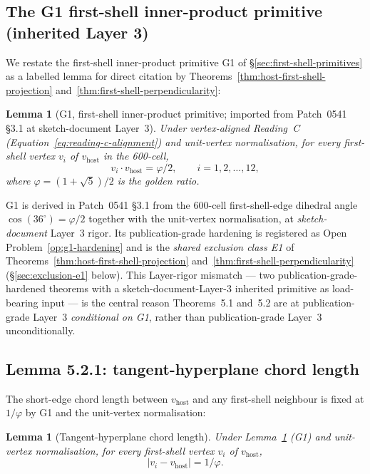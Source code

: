 \documentclass[11pt,letterpaper]{article}
\newtheorem{lemma}[theorem]{Lemma}
\newcommand{\phig}{\varphi}
\newcommand{\vhost}{v_{\text{host}}}
\begin{document}
\subsection{The G1 first-shell inner-product primitive (inherited Layer 3)}
\label{sec:g1-primitive-recap}

We restate the first-shell inner-product primitive G1 of \S\ref{sec:first-shell-primitives} as a labelled lemma for direct citation by Theorems~\ref{thm:host-first-shell-projection} and~\ref{thm:first-shell-perpendicularity}:

\begin{lemma}[G1, first-shell inner-product primitive; imported from Patch~0541 \S3.1 at sketch-document Layer~3]
\label{lem:g1-imported}
Under vertex-aligned Reading~C (Equation~\eqref{eq:reading-c-alignment}) and unit-vertex normalisation, for every first-shell vertex $v_i$ of $\vhost$ in the 600-cell,
\begin{equation}
v_i \cdot \vhost = \phig / 2, \qquad i = 1, 2, \ldots, 12,
\end{equation}
where $\phig = (1 + \sqrt{5})/2$ is the golden ratio.
\end{lemma}

G1 is derived in Patch~0541 \S3.1 from the 600-cell first-shell-edge dihedral angle $\cos(36^{\circ}) = \phig/2$ together with the unit-vertex normalisation, at \emph{sketch-document} Layer~3 rigor. Its publication-grade hardening is registered as Open Problem~\ref{op:g1-hardening} and is the \emph{shared exclusion class E1} of Theorems~\ref{thm:host-first-shell-projection} and~\ref{thm:first-shell-perpendicularity} (\S\ref{sec:exclusion-e1} below). This Layer-rigor mismatch --- two publication-grade-hardened theorems with a sketch-document-Layer-3 inherited primitive as load-bearing input --- is the central reason Theorems~5.1 and~5.2 are at publication-grade Layer~3 \emph{conditional on G1}, rather than publication-grade Layer~3 unconditionally.

\subsection{Lemma 5.2.1: tangent-hyperplane chord length}
\label{sec:tangent-hyperplane-chord-length}

The short-edge chord length between $\vhost$ and any first-shell neighbour is fixed at $1/\phig$ by G1 and the unit-vertex normalisation:

\begin{lemma}[Tangent-hyperplane chord length]
\label{lem:chord-length}
Under Lemma~\ref{lem:g1-imported} (G1) and unit-vertex normalisation, for every first-shell vertex $v_i$ of $\vhost$,
\begin{equation}
|v_i - \vhost| = 1 / \phig.
\label{eq:chord-length}
\end{equation}
\end{lemma}
\end{document}

